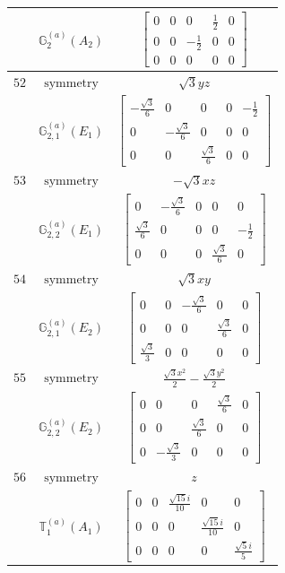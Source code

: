 \documentclass[fleqn,8pt,landscape]{jsarticle}
\begin{document}
\begin{longtable}{ccc}
$  $ & $ \mathbb{G}_{2}^{(a)}(A_{2}) $ & $ \begin{bmatrix} 0 & 0 & 0 & \frac{1}{2} & 0 \\ 0 & 0 & - \frac{1}{2} & 0 & 0 \\ 0 & 0 & 0 & 0 & 0 \end{bmatrix} $ \\ \hline
$ 52 $ & $ \text{symmetry} $ & $ \sqrt{3} y z $ \\
$  $ & $ \mathbb{G}_{2,1}^{(a)}(E_{1}) $ & $ \begin{bmatrix} - \frac{\sqrt{3}}{6} & 0 & 0 & 0 & - \frac{1}{2} \\ 0 & - \frac{\sqrt{3}}{6} & 0 & 0 & 0 \\ 0 & 0 & \frac{\sqrt{3}}{6} & 0 & 0 \end{bmatrix} $ \\ \hline
$ 53 $ & $ \text{symmetry} $ & $ - \sqrt{3} x z $ \\
$  $ & $ \mathbb{G}_{2,2}^{(a)}(E_{1}) $ & $ \begin{bmatrix} 0 & - \frac{\sqrt{3}}{6} & 0 & 0 & 0 \\ \frac{\sqrt{3}}{6} & 0 & 0 & 0 & - \frac{1}{2} \\ 0 & 0 & 0 & \frac{\sqrt{3}}{6} & 0 \end{bmatrix} $ \\ \hline
$ 54 $ & $ \text{symmetry} $ & $ \sqrt{3} x y $ \\
$  $ & $ \mathbb{G}_{2,1}^{(a)}(E_{2}) $ & $ \begin{bmatrix} 0 & 0 & - \frac{\sqrt{3}}{6} & 0 & 0 \\ 0 & 0 & 0 & \frac{\sqrt{3}}{6} & 0 \\ \frac{\sqrt{3}}{3} & 0 & 0 & 0 & 0 \end{bmatrix} $ \\ \hline
$ 55 $ & $ \text{symmetry} $ & $ \frac{\sqrt{3} x^{2}}{2} - \frac{\sqrt{3} y^{2}}{2} $ \\
$  $ & $ \mathbb{G}_{2,2}^{(a)}(E_{2}) $ & $ \begin{bmatrix} 0 & 0 & 0 & \frac{\sqrt{3}}{6} & 0 \\ 0 & 0 & \frac{\sqrt{3}}{6} & 0 & 0 \\ 0 & - \frac{\sqrt{3}}{3} & 0 & 0 & 0 \end{bmatrix} $ \\ \hline
$ 56 $ & $ \text{symmetry} $ & $ z $ \\
$  $ & $ \mathbb{T}_{1}^{(a)}(A_{1}) $ & $ \begin{bmatrix} 0 & 0 & \frac{\sqrt{15} i}{10} & 0 & 0 \\ 0 & 0 & 0 & \frac{\sqrt{15} i}{10} & 0 \\ 0 & 0 & 0 & 0 & \frac{\sqrt{5} i}{5} \end{bmatrix} $ \\ \hline

\end{longtable}
\end{document}
